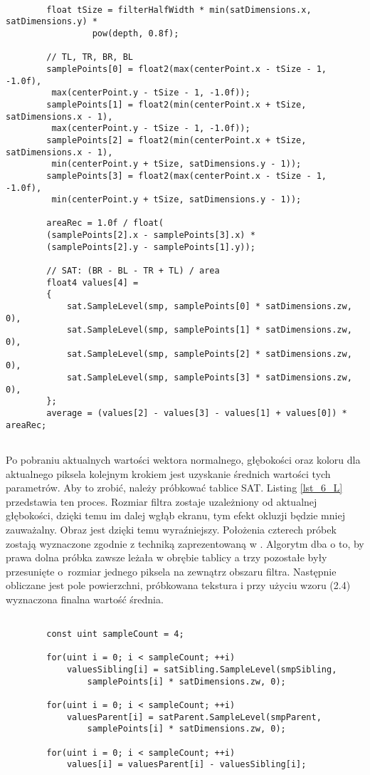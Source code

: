 		\begin{lstlisting}[language=HLSL,caption={Obliczanie wartości średniej za pomocą SAT.},label={lst_6_L}]
		
		float tSize = filterHalfWidth * min(satDimensions.x, satDimensions.y) *
				 pow(depth, 0.8f);
				 
		// TL, TR, BR, BL
		samplePoints[0] = float2(max(centerPoint.x - tSize - 1, -1.0f),
		 max(centerPoint.y - tSize - 1, -1.0f));
		samplePoints[1] = float2(min(centerPoint.x + tSize, satDimensions.x - 1),
		 max(centerPoint.y - tSize - 1, -1.0f));
		samplePoints[2] = float2(min(centerPoint.x + tSize, satDimensions.x - 1),
		 min(centerPoint.y + tSize, satDimensions.y - 1));
		samplePoints[3] = float2(max(centerPoint.x - tSize - 1, -1.0f),
		 min(centerPoint.y + tSize, satDimensions.y - 1));
		
		areaRec = 1.0f / float(
		(samplePoints[2].x - samplePoints[3].x) *
		(samplePoints[2].y - samplePoints[1].y));
		
		// SAT: (BR - BL - TR + TL) / area
		float4 values[4] =
		{
			sat.SampleLevel(smp, samplePoints[0] * satDimensions.zw, 0),
			sat.SampleLevel(smp, samplePoints[1] * satDimensions.zw, 0),
			sat.SampleLevel(smp, samplePoints[2] * satDimensions.zw, 0),
			sat.SampleLevel(smp, samplePoints[3] * satDimensions.zw, 0),
		};
		average = (values[2] - values[3] - values[1] + values[0]) * areaRec;
		
		\end{lstlisting}
		
		Po pobraniu aktualnych wartości wektora normalnego, głębokości oraz koloru dla aktualnego piksela kolejnym krokiem jest uzyskanie średnich wartości tych parametrów. Aby to zrobić, należy próbkować tablice SAT. Listing \ref{lst_6_L} przedstawia ten proces. Rozmiar filtra zostaje uzależniony od aktualnej głębokości, dzięki temu im dalej wgłąb ekranu, tym efekt okluzji będzie mniej zauważalny. Obraz jest dzięki temu wyraźniejszy. Położenia czterech próbek zostają wyznaczone zgodnie z techniką zaprezentowaną w \cite{sat}. Algorytm dba o to, by prawa dolna próbka zawsze leżała w obrębie tablicy a trzy pozostałe były przesunięte o~rozmiar jednego piksela na zewnątrz obszaru filtra. Następnie obliczane jest pole powierzchni, próbkowana tekstura i przy użyciu wzoru (2.4) wyznaczona finalna wartość średnia.

		\begin{lstlisting}[language=HLSL,caption={Różnicowe obliczanie wartości SAT.},label={lst_6_M}]

		const uint sampleCount = 4;
		
		for(uint i = 0; i < sampleCount; ++i)
			valuesSibling[i] = satSibling.SampleLevel(smpSibling, 
				samplePoints[i] * satDimensions.zw, 0);
		
		for(uint i = 0; i < sampleCount; ++i)
			valuesParent[i] = satParent.SampleLevel(smpParent, 
				samplePoints[i] * satDimensions.zw, 0);
			
		for(uint i = 0; i < sampleCount; ++i)
			values[i] = valuesParent[i] - valuesSibling[i];

		\end{lstlisting}
		
